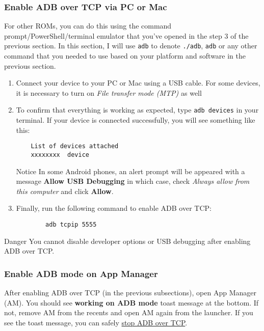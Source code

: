 \subsubsection{Enable ADB over TCP via PC or Mac}\label{subsubsec:enable-adb-over-tcp-via-pc-or-mac} %
For other ROMs, you can do this using the command prompt/PowerShell/terminal emulator that you've opened in the step 3
of the previous section. In this section, I will use \texttt{adb} to denote \texttt{./adb}, \texttt{adb} or any other
command that you needed to use based on your platform and software in the previous section.
\begin{enumerate}
    \item Connect your device to your PC or Mac using a USB cable. For some devices, it is necessary to turn on
    \textit{File transfer mode (MTP)} as well
    \item To confirm that everything is working as expected, type \texttt{adb devices} in your terminal. If your device
    is connected successfully, you will see something like this:
    \begin{Verbatim}
    List of devices attached
    xxxxxxxx  device
    \end{Verbatim}
    \begin{tip}{Notice}
        In some Android phones, an alert prompt will be appeared with a message \textbf{Allow USB Debugging}
        in which case, check \textit{Always allow from this computer} and click \textbf{Allow}.
    \end{tip}
    \item Finally, run the following command to enable ADB over TCP:
    \begin{verbatim}
        adb tcpip 5555
    \end{verbatim}
\end{enumerate}

\begin{danger}{Danger}
    You cannot disable developer options or USB debugging after enabling ADB over TCP\@.
\end{danger}

\subsubsection{Enable ADB mode on App Manager}\label{subsubsec:adb-mode-on-app-manager} %
After enabling ADB over TCP (in the previous subsections), open App Manager (AM). You should see \textbf{working on ADB
mode} toast message at the bottom. If not, remove AM from the recents and open AM again from the launcher. If you see
the toast message, you can safely \hyperref[subsubsec:stop-adb-over-tcp]{stop ADB over TCP}.

